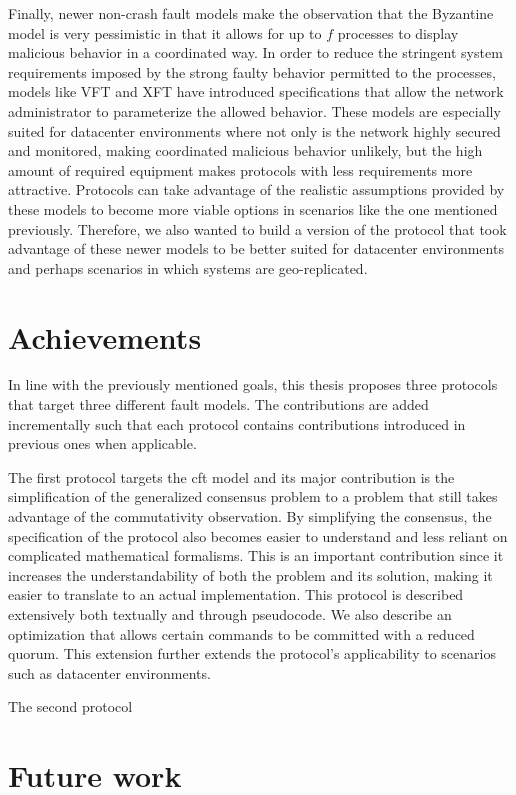 Finally, newer non-crash fault models make the observation that the Byzantine model is very pessimistic in that it allows for up to $f$ processes to display malicious behavior in a coordinated way. In order to reduce the stringent system requirements imposed by the strong faulty behavior permitted to the processes, models like VFT and XFT have introduced specifications that allow the network administrator to parameterize the allowed behavior. These models are especially suited for datacenter environments where not only is the network highly secured and monitored, making coordinated malicious behavior unlikely, but the high amount of required equipment makes protocols with less requirements more attractive. Protocols can take advantage of the realistic assumptions provided by these models to become more viable options in scenarios like the one mentioned previously. Therefore, we also wanted to build a version of the protocol that took advantage of these newer models to be better suited for datacenter environments and perhaps scenarios in which systems are geo-replicated. \par

\section{Achievements}
In line with the previously mentioned goals, this thesis proposes three protocols that target three different fault models. The contributions are added incrementally such that each protocol contains contributions introduced in previous ones when applicable. \par
The first protocol targets the \acrshort{cft} model and its major contribution is the simplification of the generalized consensus problem to a problem that still takes advantage of the commutativity observation. By simplifying the consensus, the specification of the protocol also becomes easier to understand and less reliant on complicated mathematical formalisms. This is an important contribution since it increases the understandability of both the problem and its solution, making it easier to translate to an actual implementation. This protocol is described extensively both textually and through pseudocode. We also describe an optimization that allows certain commands to be committed with a reduced quorum. This extension further extends the protocol's applicability to scenarios such as datacenter environments.\par
The second protocol

\section{Future work}
